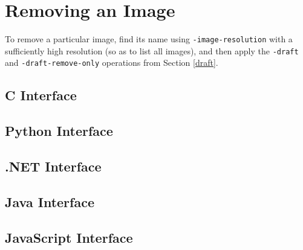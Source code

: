 \documentclass{book}
\begin{document}
\section{Removing an Image}

To remove a particular image, find its name using \texttt{-image-resolution} with a sufficiently high resolution (so as to list all images), and then apply the \texttt{-draft} and \texttt{-draft-remove-only} operations from Section \ref{draft}. 

\begin{cpdflib}
\clearpage
\section*{C Interface}
\begin{small}\tt

\end{small}
\end{cpdflib}

\begin{pycpdflib}
\clearpage
\section*{Python Interface}
\begin{small}\tt

\end{small}
\end{pycpdflib}
\pagestyle{fancy}

\begin{dotnetcpdflib}
\clearpage
\section*{.NET Interface}
\begin{small}\tt

\end{small}
\end{dotnetcpdflib}

\begin{jcpdflib}
\clearpage
\section*{Java Interface}
\begin{small}\tt

\end{small}
\end{jcpdflib}

\begin{jscpdflib}
\clearpage
\section*{JavaScript Interface}
\begin{small}\tt

\end{small}
\end{jscpdflib}
\end{document}
